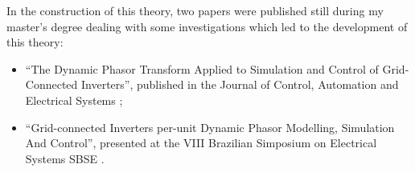 	In the construction of this theory, two papers were published still during my master's degree dealing with some investigations which led to the development of this theory:

\begin{itemize}
	\item ``The Dynamic Phasor Transform Applied to Simulation and Control of Grid-Connected Inverters'', published in the Journal of Control, Automation and Electrical Systems ;
	\item ``Grid-connected Inverters per-unit Dynamic Phasor Modelling, Simulation And Control'', presented at the VIII Brazilian Simposium on Electrical Systems SBSE .
\end{itemize}
